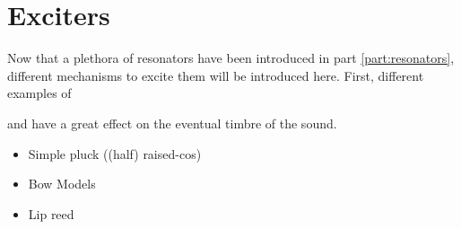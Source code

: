 \chapter*{Exciters}
Now that a plethora of resonators have been introduced in part \ref{part:resonators}, different mechanisms to excite them will be introduced here. First, different examples of 

and have a great effect on the eventual timbre of the sound. 

\begin{itemize}
    \item Simple pluck ((half) raised-cos)
    \item Bow Models
    \item Lip reed
\end{itemize}